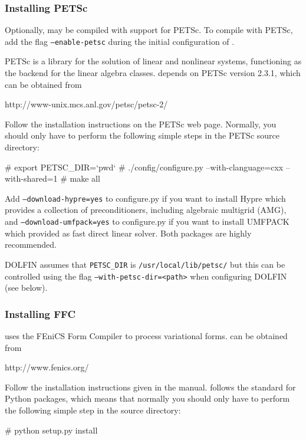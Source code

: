 \subsubsection{Installing PETSc}

Optionally, \dolfin{} may be compiled with support for PETSc. To
compile \dolfin{} with PETSc, add the flag \texttt{--enable-petsc}
during the initial configuration of \dolfin{}.

PETSc is a library for the solution of linear and nonlinear systems, functioning
as the backend for the \dolfin{} linear algebra classes. \dolfin{} depends on 
PETSc version 2.3.1, which can be obtained from
\begin{code}
http://www-unix.mcs.anl.gov/petsc/petsc-2/
\end{code}

Follow the installation instructions on the PETSc web page. Normally,
you should only have to perform the following simple steps in the PETSc
source directory:
\begin{code}
# export PETSC_DIR=`pwd`
# ./config/configure.py --with-clanguage=cxx --with-shared=1
# make all
\end{code}

Add \texttt{--download-hypre=yes} to configure.py if you want to
install Hypre which provides a collection of preconditioners,
including algebraic multigrid (AMG), and 
\texttt{--download-umfpack=yes} to configure.py if you want to
install UMFPACK which provided as fast direct linear solver.
Both packages are highly recommended.

DOLFIN assumes that \texttt{PETSC\_DIR} is \texttt{/usr/local/lib/petsc/} but
this can be controlled using the flag \texttt{--with-petsc-dir=<path>} when 
configuring DOLFIN (see below).

\subsubsection{Installing FFC}

\dolfin{} uses the FEniCS Form Compiler \ffc{} to process variational
forms. \ffc{} can be obtained from
\begin{code}
http://www.fenics.org/
\end{code}

Follow the installation instructions given in the \ffc{}
manual. \ffc{} follows the standard for Python packages, which means
that normally you should only have to perform the following simple step
in the \ffc{} source directory:
\begin{code}
# python setup.py install
\end{code}

